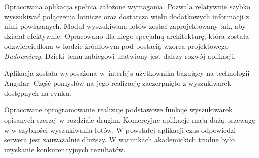 \documentclass[12pt, twoside]{report}
\begin{document}
Opracowana aplikacja spełnia założone wymagania. Pozwala relatywnie szybko wyszukiwać połączenia lotnicze oraz dostarcza wielu dodatkowych informacji z nimi powiązanych. Moduł wyszukiwana lotów został zaprojektowany tak, aby działał efektywnie. Opracowano dla niego specjalną architekturę, która została odzwierciedlona w kodzie źródłowym pod postacią wzorca projektowego \textit{Budowniczy}. Dzięki temu zabiegowi ułatwiony jest dalszy rozwój aplikacji.
 
Aplikacja została wyposażona w~interfejs użytkownika bazujący na technologii Angular.  Część pomysłów na jego realizację zaczerpnięto z wyszukiwarek dostępnych na rynku.


Opracowane oprogramowanie realizuje podstawowe funkcje wyszukiwarek opisanych szerzej w rozdziale drugim. Komercyjne aplikacje mają dużą przewagę w w szybkości wyszukiwania lotów. W powstałej aplikacji czas odpowiedzi serwera jest zauważalnie dłuższy. W warunkach akademickich trudne było uzyskanie konkurencyjnych rezultatów.
\end{document}
